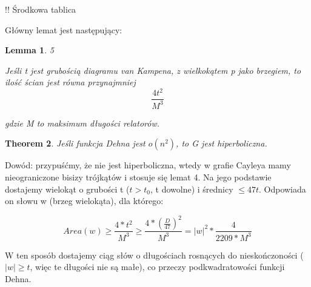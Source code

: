 \documentclass[twoside]{article}
\newcounter{lecnum}
\newtheorem{theorem}{Theorem}[lecnum]
\newtheorem{lemma}[theorem]{Lemma}
\begin{document}
!! Środkowa tablica

Główny lemat jest następujący:

\begin{lemma}
 
{\huge 5}

 
Jeśli t jest grubością diagramu van Kampena, z wielkokątem p jako brzegiem, to ilość ścian jest równa przynajmniej 
\[ \frac{4t^2}{M^3} \]

gdzie M to maksimum długości relatorów.

\end{lemma}

\begin{theorem}

Jeśli funkcja Dehna jest $o(n^2)$, to G jest hiperboliczna.

\end{theorem}


Dowód: przypuśćmy, że nie jest hiperboliczna, wtedy w grafie Cayleya mamy nieograniczone bisizy trójkątów i stosuje się lemat 4. Na jego podstawie dostajemy wielokąt o grubości t ($t > t_{0}$, t dowolne) i średnicy $\leq 47t$. Odpowiada on słowu w (brzeg wielokąta), dla którego:

\[ Area(w) \geq \frac{4* t^2}{M^3} \geq \frac{4 * (\frac{D}{47})^2}{M^3} = |w|^2 * \frac{4}{2209 * M^3}  \]

W ten sposób dostajemy ciąg słów o długościach rosnących do nieskończoności ($|w| \geq t$, więc te długości nie są małe), co przeczy podkwadratowości funkcji Dehna.


\end{document}
